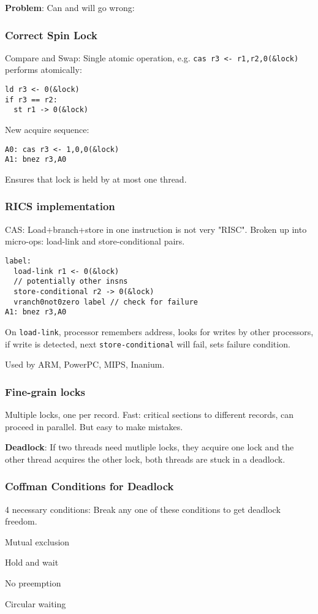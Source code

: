 \documentclass[a4paper, fontsize=8pt, landscape, DIV=1]{scrartcl}
\makeatletter
\renewenvironment{outline}[1][]{%
  \ifthenelse{\equal{#1}{}}{}{\renewcommand{\ol@type}{#1}}%
  \ol@z%
  \newcommand{\0}{\ol@toz\ol@z}%
  \newcommand{\1}{\vspace{\dimexpr\outlinespacingscalar\baselineskip-\baselineskip}\ol@toi\ol@i\item}%
  \newcommand{\2}{\vspace{\dimexpr\outlinespacingscalartwo\baselineskip-\baselineskip}\ol@toii\ol@ii\item}%
  \newcommand{\3}{\vspace{\dimexpr\outlinespacingscalar\baselineskip-\baselineskip}\ol@toiii\ol@iii\item}%
  \newcommand{\4}{\vspace{\dimexpr\outlinespacingscalar\baselineskip-\baselineskip}\ol@toiiii\ol@iiii\item}%
}{%
  \ol@toz\ol@exit%
}
\def\outlinespacingscalar{0.5}
\def\outlinespacingscalartwo{0.5}
\makeatother
\begin{document}
\begin{multicols*}{4}
  \textbf{Problem}: Can and will go wrong:

  \subsubsection{Correct Spin Lock}
  Compare and Swap: Single atomic operation, e.g. \texttt{cas r3 <- r1,r2,0(\&lock)} performs atomically:
  \begin{lstlisting}[language={[x86masm]Assembler}]
ld r3 <- 0(&lock)
if r3 == r2:
  st r1 -> 0(&lock)\end{lstlisting}
  New acquire sequence:
  \begin{lstlisting}[language={[x86masm]Assembler}]
A0: cas r3 <- 1,0,0(&lock)
A1: bnez r3,A0\end{lstlisting}
  Ensures that lock is held by at most one thread.

  \subsubsection{RICS implementation}
  CAS: Load+branch+store in one instruction is not very "RISC". Broken up into 
  micro-ops: load-link and store-conditional pairs.
  \begin{lstlisting}[language={[x86masm]Assembler}]
label:
  load-link r1 <- 0(&lock)
  // potentially other insns
  store-conditional r2 -> 0(&lock)
  vranch0not0zero label // check for failure
A1: bnez r3,A0\end{lstlisting}
  On \texttt{load-link}, processor remembers address, looks for writes by other processors,
  if write is detected, next \texttt{store-conditional} will fail, sets failure condition.

  Used by ARM, PowerPC, MIPS, Inanium.

  \subsubsection{Fine-grain locks}
  Multiple locks, one per record. Fast: critical sections to different records, can
  proceed in parallel. But easy to make mistakes. 

  \textbf{Deadlock}: If two threads need mutliple locks, they acquire one lock
  and the other thread acquires the other lock, both threads are stuck in a deadlock.

  \subsubsection{Coffman Conditions for Deadlock}
  4 necessary conditions: Break any one of these conditions to get deadlock freedom.
  \begin{outline}
    \1 Mutual exclusion
    \1 Hold and wait
    \1 No preemption
    \1 Circular waiting
  \end{outline}


\end{multicols*}
\end{document}
